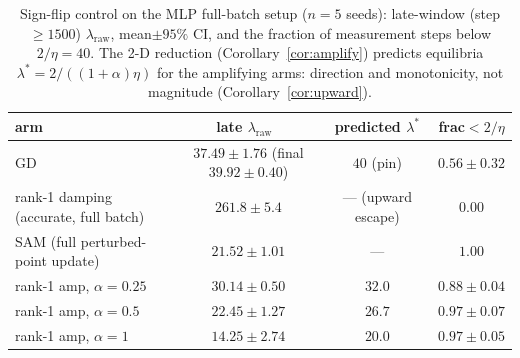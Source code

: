 \documentclass{article}
\theoremstyle{plain}
\theoremstyle{definition}
\theoremstyle{remark}
\newcommand{\lraw}{\ensuremath{\lambda_{\mathrm{raw}}}}
\newcommand{\RTableTopGap}{%
  \setlength{\abovetopsep}{2pt}%
}
\newcommand{\RTableDenseRules}{%
  \setlength{\aboverulesep}{.55ex}%
  \setlength{\belowrulesep}{.75ex}%
}
\begin{document}
\begin{table}[!ht]
\centering\small\setlength{\tabcolsep}{4pt}
\caption{Sign-flip control on the MLP full-batch setup ($n{=}5$ seeds):
late-window (step $\geq 1500$) \lraw, mean$\pm 95\%$ CI, and the fraction
of measurement steps below $2/\eta{=}40$. The 2-D reduction
(Corollary~\ref{cor:amplify}) predicts equilibria
$\lambda^{*}=2/((1{+}\alpha)\eta)$ for the amplifying arms: direction and
monotonicity, not magnitude (Corollary~\ref{cor:upward}).}
\label{tab:amp}
{\renewcommand{\arraystretch}{1.12}\RTableTopGap\RTableDenseRules
\begin{tabular}{lccc}
\toprule
arm & late \lraw\ & predicted $\lambda^{*}$ & frac${<}2/\eta$ \\
\midrule
GD                        & $37.49\!\pm\!1.76$ (final $39.92\!\pm\!0.40$) & $40$ (pin) & $0.56\!\pm\!0.32$ \\
rank-1 damping (accurate, full batch) & $261.8\!\pm\!5.4$  & --- (upward escape) & $0.00$ \\
SAM (full perturbed-point update) & $21.52\!\pm\!1.01$ & --- & $1.00$ \\
\midrule
rank-1 amp, $\alpha{=}0.25$ & $30.14\!\pm\!0.50$ & $32.0$ & $0.88\!\pm\!0.04$ \\
rank-1 amp, $\alpha{=}0.5$  & $22.45\!\pm\!1.27$ & $26.7$ & $0.97\!\pm\!0.07$ \\
rank-1 amp, $\alpha{=}1$    & $14.25\!\pm\!2.74$ & $20.0$ & $0.97\!\pm\!0.05$ \\
\bottomrule
\end{tabular}}
\end{table}
\end{document}
